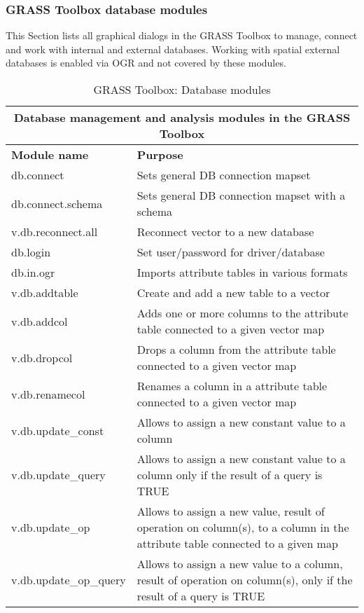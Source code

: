 \subsubsection{GRASS Toolbox database modules}

This Section lists all graphical dialogs in the GRASS Toolbox to manage, 
connect and work with internal and external databases. Working with spatial 
external databases is enabled via OGR and not covered by these modules.

\begin{table}[ht]
\centering
\caption{GRASS Toolbox: Database modules}\medskip
 \begin{tabular}{|p{4cm}|p{12cm}|}
  \hline \multicolumn{2}{|c|}{\textbf{Database management and analysis modules in the GRASS
  Toolbox}} \\
  \hline \textbf{Module name} & \textbf{Purpose} \\
  \hline db.connect & Sets general DB connection mapset \\
  \hline db.connect.schema & Sets general DB connection mapset with a schema \\
  \hline v.db.reconnect.all & Reconnect vector to a new database \\
  \hline db.login & Set user/password for driver/database \\
  \hline db.in.ogr & Imports attribute tables in various formats \\
  \hline v.db.addtable & Create and add a new table to a vector \\
  \hline v.db.addcol & Adds one or more columns to the attribute table
  connected to a given vector map \\
  \hline v.db.dropcol & Drops a column from the attribute table connected to
  a given vector map\\
  \hline v.db.renamecol & Renames a column in a attribute table connected to
  a given vector map\\
  \hline v.db.update\_const & Allows to assign a new constant value to a
  column \\
  \hline v.db.update\_query & Allows to assign a new constant value to a
  column only if the result of a query is TRUE \\
  \hline v.db.update\_op & Allows to assign a new value, result of operation
  on column(s), to a column in the attribute table connected to a given map\\
  \hline v.db.update\_op\_query & Allows to assign a new value to a column,
  result of operation on column(s), only if the result of a query is TRUE \\

\end{tabular}
\end{table}
